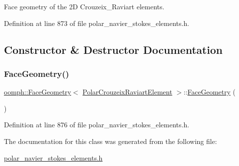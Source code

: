 Face geometry of the 2D Crouzeix\+\_\+\+Raviart elements. 

Definition at line 873 of file polar\+\_\+navier\+\_\+stokes\+\_\+elements.\+h.



\subsection{Constructor \& Destructor Documentation}
\mbox{\label{classoomph_1_1FaceGeometry_3_01PolarCrouzeixRaviartElement_01_4_a312ae3b4c0a6d7007dd09a424b44196b}} 
\subsubsection{\texorpdfstring{Face\+Geometry()}{FaceGeometry()}}
{\footnotesize\ttfamily \hyperlink{classoomph_1_1FaceGeometry}{oomph\+::\+Face\+Geometry}$<$ \hyperlink{classoomph_1_1PolarCrouzeixRaviartElement}{Polar\+Crouzeix\+Raviart\+Element} $>$\+::\hyperlink{classoomph_1_1FaceGeometry}{Face\+Geometry} (\begin{DoxyParamCaption}{ }\end{DoxyParamCaption})\hspace{0.3cm}{\ttfamily [inline]}}



Definition at line 876 of file polar\+\_\+navier\+\_\+stokes\+\_\+elements.\+h.



The documentation for this class was generated from the following file\+:\begin{DoxyCompactItemize}
\item 
\hyperlink{polar__navier__stokes__elements_8h}{polar\+\_\+navier\+\_\+stokes\+\_\+elements.\+h}\end{DoxyCompactItemize}
